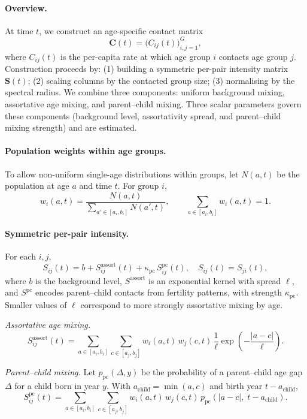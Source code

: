 \documentclass[11pt]{article}
\begin{document}
\paragraph{Overview.}
At time \(t\), we construct an age-specific contact matrix
\[
\mathbf{C}(t) = \big(C_{ij}(t)\big)_{i,j=1}^G,
\]
where \(C_{ij}(t)\) is the per-capita rate at which age group \(i\) contacts age group \(j\). Construction proceeds by:
(1) building a symmetric per-pair intensity matrix \(\mathbf{S}(t)\);
(2) scaling columns by the contacted group size;
(3) normalising by the spectral radius.
We combine three components: uniform background mixing, assortative age mixing, and parent–child mixing. Three scalar parameters govern these components (background level, assortativity spread, and parent–child mixing strength) and are estimated.

\paragraph{Population weights within age groups.}
To allow non-uniform single-age distributions within groups, let \(N(a,t)\) be the population at age \(a\) and time \(t\). For group \(i\),
\[
w_i(a,t) = \frac{N(a,t)}{\sum_{a' \in [a_i,b_i]} N(a',t)},\qquad
\sum_{a \in [a_i,b_i]} w_i(a,t)=1.
\]

\paragraph{Symmetric per-pair intensity.}
For each \(i,j\),
\[
S_{ij}(t) = b + S^{\mathrm{assort}}_{ij}(t) + \kappa_{\mathrm{pc}}\, S^{\mathrm{pc}}_{ij}(t),
\quad S_{ij}(t)=S_{ji}(t),
\]
where \(b\) is the background level, \(S^{\mathrm{assort}}\) is an exponential kernel with spread \(\ell\), and \(S^{\mathrm{pc}}\) encodes parent–child contacts from fertility patterns, with strength \(\kappa_{\mathrm{pc}}\). Smaller values of \(\ell\) correspond to more strongly assortative mixing by age.

\emph{Assortative age mixing.}
\[
S^{\mathrm{assort}}_{ij}(t)
=
\sum_{a \in [a_i,b_i]}
\sum_{c \in [a_j,b_j]}
w_i(a,t)\, w_j(c,t)\,
\frac{1}{\ell}
\exp\!\left(-\frac{|a-c|}{\ell}\right).
\]

\emph{Parent–child mixing.}
Let \(p_{\mathrm{pc}}(\Delta, y)\) be the probability of a parent–child age gap \(\Delta\) for a child born in year \(y\). With \(a_{\mathrm{child}}=\min(a,c)\) and birth year \(t-a_{\mathrm{child}}\),
\[
S^{\mathrm{pc}}_{ij}(t)
=
\sum_{a \in [a_i,b_i]}
\sum_{c \in [a_j,b_j]}
w_i(a,t)\, w_j(c,t)\,
p_{\mathrm{pc}}\!\left(|a-c|,\; t - a_{\mathrm{child}}\right).
\]
\end{document}
